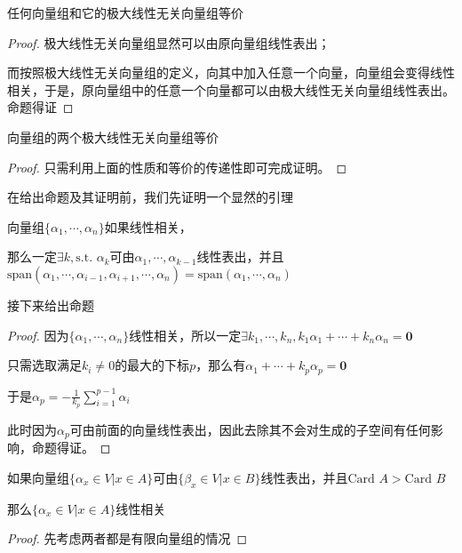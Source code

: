 \documentclass[12pt, a4paper, oneside, UTF8]{ctexbook}
\begin{document}
			\begin{para}{0}
					\begin{proposition}
						任何向量组和它的极大线性无关向量组等价
					\end{proposition}
					\begin{proof}
						极大线性无关向量组显然可以由原向量组线性表出；

						而按照极大线性无关向量组的定义，向其中加入任意一个向量，向量组会变得线性相关，于是，原向量组中的任意一个向量都可以由极大线性无关向量组线性表出。命题得证
					\end{proof}
					\begin{proposition}
						向量组的两个极大线性无关向量组等价
					\end{proposition}
					\begin{proof}
						只需利用上面的性质和等价的传递性即可完成证明。
					\end{proof}
					在给出命题及其证明前，我们先证明一个显然的引理
					\begin{lemma}{}{}
						向量组$\{\alpha_1,\cdots,\alpha_n\}$如果线性相关，
						
						那么一定$\exists k,\text{s.t. }\alpha_k$可由$\alpha_1,\cdots,\alpha_{k-1}$线性表出，并且$\text{span}(\alpha_1,\cdots,\alpha_{i-1},\alpha_{i+1},\cdots,\alpha_n)=\text{span}(\alpha_1,\cdots,\alpha_n)$
					\end{lemma}
					接下来给出命题
					\begin{proof}
						因为$\{\alpha_1,\cdots,\alpha_n\}$线性相关，所以一定$\exists k_1,\cdots,k_n,k_1 \alpha_1+\cdots+k_n \alpha_n = \mathbf{0}$

						只需选取满足$k_i \neq 0$的最大的下标$p$，那么有$\alpha_1+\cdots+k_p \alpha_p = \mathbf{0}$

						于是$\alpha_p = -\frac{1}{k_p} \sum\limits_{i=1}^{p-1} \alpha_i$

						此时因为$\alpha_p$可由前面的向量线性表出，因此去除其不会对生成的子空间有任何影响，命题得证。
					\end{proof}
					\begin{proposition}
						如果向量组$\{\alpha_x \in V| x \in A\}$可由$\{\beta_x \in V| x \in B\}$线性表出，并且$\text{Card } A > \text{Card }B$

						那么$\{\alpha_x \in V| x \in A\}$线性相关
					\end{proposition}
					\begin{proof}
						先考虑两者都是有限向量组的情况


\end{proof}
\end{para}
\end{document}

